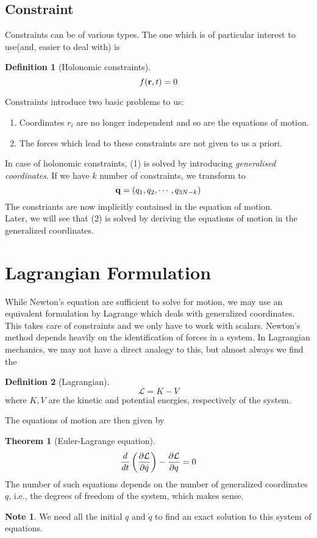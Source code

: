 \documentclass[10pt, a4paper]{extarticle}
\theoremstyle{definition}
\newtheorem{thm}{Theorem}
\newtheorem{defn}{Definition}
\newtheorem*{note*}{Note}
\begin{document}
\subsection{Constraint}
Constraints can be of various types. The one which is of particular interest to use(and, easier to deal with) is
\begin{framed}
	\begin{defn}[Holonomic constraints]
		\[f(\vb{r},t)=0\]
	\end{defn}
\end{framed}
Constraints introduce two basic problems to us:
\begin{framed}
	\begin{enumerate}
		\item Coordinates $r_i$ are no longer independent and so are the equations of motion.
		\item The forces which lead to these constraints are not given to us a priori.
	\end{enumerate}
	In case of holonomic constraints, (1) is solved by introducing \emph{generalised coordinates}. If we have $k$ number of constraints, we transform to
	\[ \vb{q}=(q_1,q_2,\cdots,q_{3N-k})\]
	The constriants are now implicitly contained in the equation of motion.\\
	Later, we will see that (2) is solved by deriving the equations of motion in the generalized coordinates.
\end{framed}

\section{Lagrangian Formulation}
While Newton's equation are sufficient to solve for motion, we may use an equivalent formulation by Lagrange which deals with generalized coordinates. This takes care of constraints and we only have to work with scalars.
Newton's method depends heavily on the identification of forces in a system. In Lagrangian mechanics, we may not have a direct analogy to this, but almost always we find the
\begin{framed}
	\begin{defn}[Lagrangian]
		\[\mathcal{L}=K-V\] where $K,V$ are the kinetic and potential energies, respectively of the system.
	\end{defn}
\end{framed}
The equations of motion are then given by
\begin{framed}
\begin{thm}[Euler-Lagrange equation]
	\[\frac{d}{dt}\left(\pdv{\mathcal{L}}{\dot{q}}\right)-\pdv{\mathcal{L}}{q}=0\]
	The number of such equations depends on the number of generalized coordinates $q$, i.e., the degrees of freedom of the system, which makes sense.
\end{thm}
\begin{note*}
	We need all the initial $q$ and $\dot{q}$ to find an exact solution to this system of equations.
\end{note*}
\end{framed}
\end{document}

